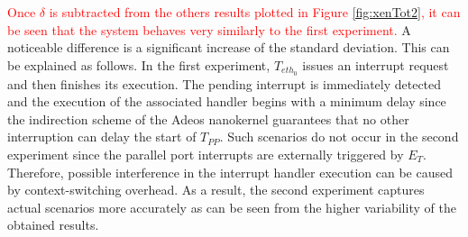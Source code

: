 \documentclass{acm_proc_article-sp}
\newcommand{\col}[1]{\textcolor{red}{#1}}
\begin{document}
\col{Once $\delta$ is subtracted from the others results plotted in Figure \ref{fig:xenTot2},
it can be seen that the system behaves very similarly to the first experiment. }
A noticeable difference is a significant increase of the
standard deviation. This can be explained as follows. In the first experiment,
$T_{eth_0}$ issues an interrupt request and then finishes its execution. The pending
interrupt is immediately detected and the execution of the associated handler begins
with a minimum delay since the indirection scheme of the Adeos nanokernel guarantees
that no other interruption can delay the start of $T_{PP}$. Such scenarios
do not occur in the second experiment since the parallel port interrupts are
externally triggered by $E_T$. Therefore, possible interference in the interrupt
handler execution can be caused by context-switching overhead. As a result, the
second experiment captures actual scenarios more accurately as can be seen
from the higher variability of the obtained results.

%
 
\end{document}
